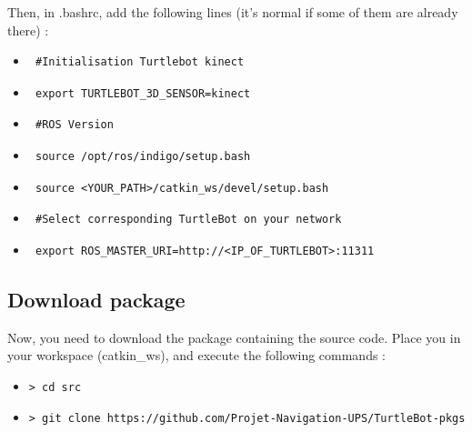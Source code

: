 \documentclass[10pt,a4paper]{article}
\begin{document}
Then, in .bashrc, add the following lines (it's normal if some of them are already there) :

\begin{itemize}
\item[]  \begin{verbatim} #Initialisation Turtlebot kinect \end{verbatim}
\item[]  \begin{verbatim} export TURTLEBOT_3D_SENSOR=kinect \end{verbatim}
\item[]  \begin{verbatim} #ROS Version \end{verbatim}
\item[]  \begin{verbatim} source /opt/ros/indigo/setup.bash \end{verbatim}
\item[]  \begin{verbatim} source <YOUR_PATH>/catkin_ws/devel/setup.bash \end{verbatim}
\item[]  \begin{verbatim} #Select corresponding TurtleBot on your network \end{verbatim}
\item[]  \begin{verbatim} export ROS_MASTER_URI=http://<IP_OF_TURTLEBOT>:11311  \end{verbatim}
\end{itemize}

\subsection{Download package}

Now, you need to download the package containing the source code. Place you in your workspace (catkin\_ws), and execute the following commands :

\begin{itemize}
\item[]  \begin{verbatim}> cd src \end{verbatim}
\item[]  \begin{verbatim}> git clone https://github.com/Projet-Navigation-UPS/TurtleBot-pkgs \end{verbatim}
\end{itemize}
\end{document}

